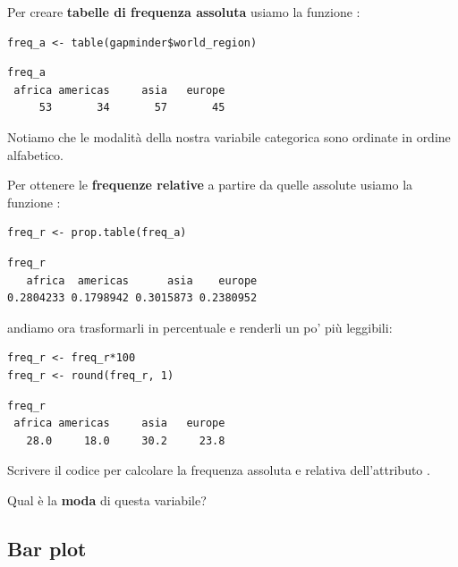 Per creare \textbf{tabelle di frequenza assoluta} usiamo la funzione :

\begin{lstlisting}[style=Rstylescript]
freq_a <- table(gapminder$world_region)
\end{lstlisting}

\begin{lstlisting}[style=Rstyle]
freq_a	
 africa americas     asia   europe 
     53       34       57       45 
\end{lstlisting}
%
Notiamo che le modalit\`a della nostra variabile categorica sono ordinate in ordine alfabetico.

\noindent Per ottenere le \textbf{frequenze relative} a partire da quelle assolute usiamo la funzione :

\begin{lstlisting}[style=Rstylescript]
freq_r <- prop.table(freq_a)
\end{lstlisting}

\begin{lstlisting}[style=Rstyle]
freq_r	
   africa  americas      asia    europe 
0.2804233 0.1798942 0.3015873 0.2380952
\end{lstlisting}
%
andiamo ora trasformarli in percentuale e renderli un po' pi\`u leggibili:

\begin{lstlisting}[style=Rstylescript]
freq_r <- freq_r*100
freq_r <- round(freq_r, 1)
\end{lstlisting}


\begin{lstlisting}[style=Rstyle]
freq_r	
 africa americas     asia   europe 
   28.0     18.0     30.2     23.8
\end{lstlisting}

\vspace{0.5cm} 

\begin{exercise}\label{ex4.1}
	
\noindent Scrivere il codice per calcolare la frequenza assoluta e relativa dell'attributo .	
 
\noindent Qual \`e la \textbf{moda} di questa variabile?

\end{exercise}

\subsection{Bar plot}

